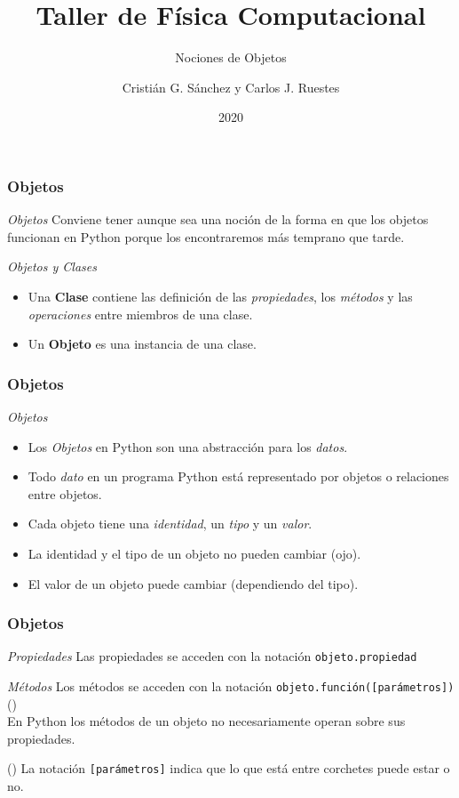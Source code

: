\documentclass{beamer}
\title{Taller de Física Computacional}
\subtitle{Nociones de Objetos}
\author{Cristián G. Sánchez y Carlos J. Ruestes}
\date{2020}
\begin{document}
\frame{\titlepage}

\begin{frame}[fragile]
\frametitle{Objetos}
\begin{block}{{\em Objetos}}
Conviene tener aunque sea una noción de la forma en que los objetos funcionan en Python porque los encontraremos más temprano que tarde.
\end{block}
\begin{block}{{\em Objetos y Clases}}
\begin{itemize}
\item Una {\bf Clase} contiene las definición de las {\em propiedades}, los {\em métodos} y las {\em operaciones} entre miembros de una clase.
\item Un {\bf Objeto} es una instancia de una clase.
\end{itemize}
\end{block}
\end{frame}

\begin{frame}[fragile]
\frametitle{Objetos}
\begin{block}{{\em Objetos}}
\begin{itemize}
\item Los {\em Objetos} en Python son una abstracción para los {\em datos}. 
\item Todo {\em dato} en un programa Python está representado por objetos o relaciones entre objetos.
\item Cada objeto tiene una {\em identidad}, un {\em tipo} y un {\em valor}.
\item La identidad y el tipo de un objeto no pueden cambiar (ojo).
\item El valor de un objeto puede cambiar (dependiendo del tipo).
\end{itemize}
\end{block}
\end{frame}

\begin{frame}[fragile]
\frametitle{Objetos}

\begin{block}{{\em Propiedades}}
Las propiedades se acceden con la notación  \texttt{objeto.propiedad}
\end{block}
\begin{block}{{\em Métodos}}
Los métodos se acceden con la notación  \texttt{objeto.función([parámetros])} (\dag)\\
En Python los métodos de un objeto no necesariamente operan sobre sus propiedades.
\end{block} 
(\dag) La notación \texttt{[parámetros]} indica que lo que está entre corchetes puede estar o no. 
\end{frame}
\end{document}
